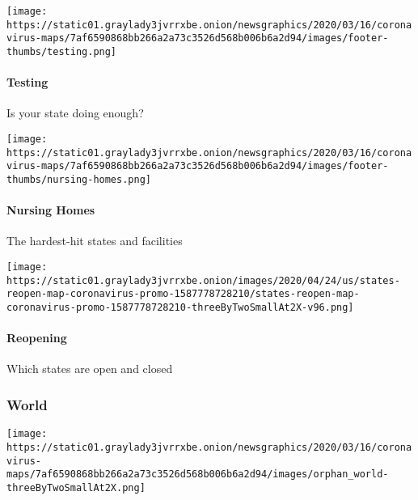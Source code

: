 \texttt{[image: https://static01.graylady3jvrrxbe.onion/newsgraphics/2020/03/16/coronavirus-maps/7af6590868bb266a2a73c3526d568b006b6a2d94/images/footer-thumbs/testing.png]}

\hypertarget{testing}{%
\paragraph{Testing}\label{testing}}

Is your state doing enough?

\href{https://www.nytimes3xbfgragh.onion/interactive/2020/us/coronavirus-nursing-homes.html}{}

\texttt{[image: https://static01.graylady3jvrrxbe.onion/newsgraphics/2020/03/16/coronavirus-maps/7af6590868bb266a2a73c3526d568b006b6a2d94/images/footer-thumbs/nursing-homes.png]}

\hypertarget{nursing-homes}{%
\paragraph{Nursing Homes}\label{nursing-homes}}

The hardest-hit states and facilities

\href{https://www.nytimes3xbfgragh.onion/interactive/2020/us/states-reopen-map-coronavirus.html}{}

\texttt{[image: https://static01.graylady3jvrrxbe.onion/images/2020/04/24/us/states-reopen-map-coronavirus-promo-1587778728210/states-reopen-map-coronavirus-promo-1587778728210-threeByTwoSmallAt2X-v96.png]}

\hypertarget{reopening}{%
\paragraph{Reopening}\label{reopening}}

Which states are open and closed

\hypertarget{world}{%
\subsubsection{World}\label{world}}

\href{https://www.nytimes3xbfgragh.onion/interactive/2020/world/coronavirus-maps.html}{}

\texttt{[image: https://static01.graylady3jvrrxbe.onion/newsgraphics/2020/03/16/coronavirus-maps/7af6590868bb266a2a73c3526d568b006b6a2d94/images/orphan\_world-threeByTwoSmallAt2X.png]}

